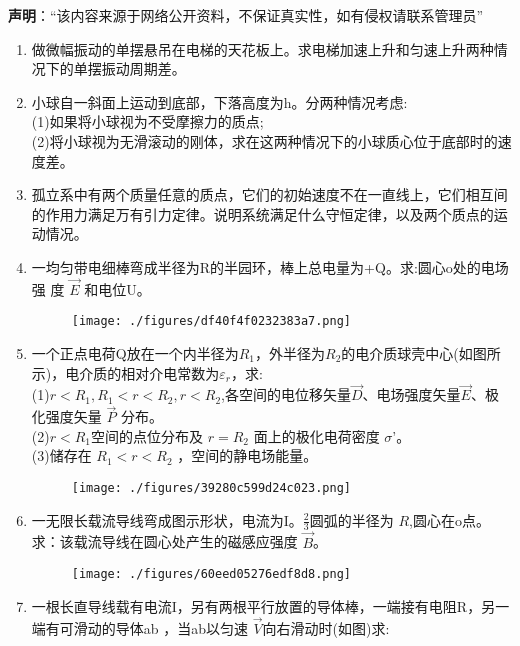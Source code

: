 
\textbf{声明}：“该内容来源于网络公开资料，不保证真实性，如有侵权请联系管理员”


\begin{enumerate}
\item 做微幅振动的单摆悬吊在电梯的天花板上。求电梯加速上升和匀速上升两种情况下的单摆振动周期差。
\item 小球自一斜面上运动到底部，下落高度为h。分两种情况考虑:\\
(1)如果将小球视为不受摩擦力的质点;\\
(2)将小球视为无滑滚动的刚体，求在这两种情况下的小球质心位于底部时的速度差。
\item 孤立系中有两个质量任意的质点，它们的初始速度不在一直线上，它们相互间的作用力满足万有引力定律。说明系统满足什么守恒定律，以及两个质点的运动情况。
\item 一均匀带电细棒弯成半径为R的半园环，棒上总电量为+Q。求:圆心o处的电场强
度 $\vec{E}$ 和电位U。\begin{figure}[ht]
\centering
\texttt{[image: ./figures/df40f4f0232383a7.png]}
\caption{} \label{fig_SSD103_1}
\end{figure}
\item 一个正点电荷Q放在一个内半径为$R_1$，外半径为$R_2$的电介质球壳中心(如图所示)，电介质的相对介电常数为$\varepsilon_r$，求:\\
(1)$r<R_1,R_1<r<R_2,r<R_2$,各空间的电位移矢量$\vec D$、电场强度矢量$\vec{E}$、极化强度矢量 $\vec P$ 分布。\\
(2)$r<R_1$空间的点位分布及 $r=R_2$ 面上的极化电荷密度 $\sigma$'。\\
(3)储存在 $R_1<r<R_2$ ，空间的静电场能量。
\begin{figure}[ht]
\centering
\texttt{[image: ./figures/39280c599d24c023.png]}
\caption{} \label{fig_SSD103_2}
\end{figure}
\item 一无限长载流导线弯成图示形状，电流为I。$\frac{2}{3}$圆弧的半径为 $R$,圆心在o点。求：该载流导线在圆心处产生的磁感应强度 $\vec B$。
\begin{figure}[ht]
\centering
\texttt{[image: ./figures/60eed05276edf8d8.png]}
\caption{} \label{fig_SSD103_3}
\end{figure}
\item 一根长直导线载有电流I，另有两根平行放置的导体棒，一端接有电阻R，另一端有可滑动的导体ab ，当ab以匀速 $\vec V$向右滑动时(如图)求:\\

\end{enumerate}
